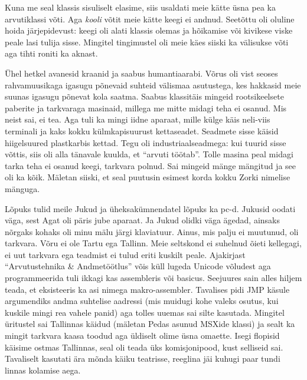 Kuna me seal klassis sisuliselt elasime, siis usaldati meie kätte üsna pea ka arvutiklassi võti. Aga \emph{kooli} võtit meie kätte keegi ei andnud. Seetõttu oli oluline hoida järjepidevust: keegi oli alati klassis olemas ja hõikamise või kivikese viske peale lasi tulija sisse. Mingitel tingimustel oli meie käes siiski ka välisukse võti aga tihti roniti ka aknast. 

Ühel hetkel avanesid kraanid ja saabus humantiaarabi. Võrus oli vist seoses rahvamuusikaga igasugu põnevaid suhteid välismaa asutustega, kes hakkasid meie suunas igasugu põnevat kola saatma. Saabus klassitäis mingeid rootsikeelsete paberite ja tarkvaraga masinaid, millega me mitte midagi teha ei osanud. Mis neist sai, ei tea. Aga tuli ka mingi iidne aparaat, mille külge käis neli-viis terminali ja kaks kokku külmkapisuurust kettaseadet. Seadmete sisse käisid hiigelsuured plastkarbis kettad. Tegu oli industriaalseadmega: kui tuurid sisse võttis, siis oli alla tänavale kuulda, et \enquote{arvuti töötab}. Tolle masina peal midagi tarka teha ei osanud keegi, tarkvara polnud. Sai mingeid mänge mängitud ja see oli ka kõik. Mäletan siiski, et seal puutusin esimest korda kokku Zorki nimelise mänguga.

Lõpuks tulid meile Jukud ja üheksakümnendatel lõpuks ka pc-d. Jukusid oodati väga, sest Agat oli päris jube aparaat. Ja Jukud olidki väga ägedad, ainsaks nõrgaks kohaks oli minu mälu järgi klaviatuur. Ainus, mis palju ei muutunud, oli tarkvara. Võru ei ole Tartu ega Tallinn. Meie seltskond ei suhelnud õieti kellegagi, ei uut tarkvara ega teadmist ei tulud eriti kuskilt peale. Ajakirjast \enquote{Arvutustehnika \& Andmetöötlus} võis küll lugeda Unicode võludest aga programmeerida tuli ikkagi kas assembleris või basicus. Seejuures sain alles hiljem teada, et eksisteeris ka asi nimega makro-assembler. Tavalises pidi JMP käsule argumendiks andma suhtelise aadressi (mis muidugi kohe valeks osutus, kui kuskile mingi rea vahele panid) aga tolles uuemas sai silte kasutada. Mingitel üritustel sai Tallinnas käidud (mäletan Pedas asunud MSXide klassi) ja sealt ka mingit tarkvara kaasa toodud aga üldiselt olime üsna omaette. Isegi flopisid käisime ostmas Tallinnas, seal oli teada üks komisjonipood, kust selliseid sai. Tavaliselt kasutati ära mõnda käiku teatrisse, reeglina jäi kuhugi paar tundi linnas kolamise aega. 

